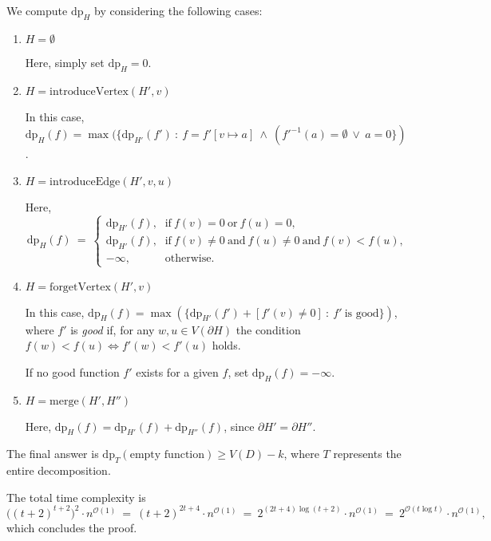 \documentclass[12pt]{article}
\begin{document}
	We compute \(\text{dp}_{H}\) by considering the following cases:
	\begin{enumerate}
		\item \(H = \emptyset\)
		      
		      Here, simply set \(\text{dp}_{H} = 0\).
		
		\item \(H = \text{introduceVertex}(H', v)\)
		      
		      In this case, \(\text{dp}_{H}(f) = \max(\{\text{dp}_{H'}(f') \ : \
		      f = f'[v \mapsto a] \ \wedge \ (f'^{-1}(a) = \emptyset \ \vee \ a
		      = 0\})\).
		
		\item \(H = \text{introduceEdge}(H', v, u)\)
		      
		      Here,
		      \[ \text{dp}_{H}(f) \ = \ \begin{cases} \text{dp}_{H'}(f) \text{,}
		      & \text{if} \ f(v) = 0 \ \text{or} \ f(u) = 0 \text{,} \\
		      \text{dp}_{H'}(f) \text{,} & \text{if} \ f(v) \neq 0 \ \text{and}
		      \ f(u) \neq 0 \ \text{and} \ f(v) < f(u) \text{,} \\
		      -\infty \text{,} & \text{otherwise.} \end{cases} \]
		
		\item \(H = \text{forgetVertex}(H', v)\)
		      
		      In this case, \(\text{dp}_{H}(f) = \max(\{\text{dp}_{H'}(f') +
		      [f'(v) \neq 0] \ : \ f' \ \text{is good}\})\), where \(f'\) is
		      \textit{good} if, for any \(w, u \in V(\partial H)\) the condition
		      \(f(w) < f(u) \iff f'(w) < f'(u)\) holds.
		      
		      If no good function \(f'\) exists for a given \(f\), set
		      \(\text{dp}_{H}(f) = -\infty\).
		
		\item \(H = \text{merge}(H', H'')\)
		      
		      Here, \(\text{dp}_{H}(f) = \text{dp}_{H'}(f) +
		      \text{dp}_{H''}(f)\), since \(\partial H' = \partial H''\).
	\end{enumerate}
	The final answer is \(\text{dp}_{T}(\text{empty function}) \geqslant V(D) -
	k\), where \(T\) represents the entire decomposition.
	
	\medskip
	
	The total time complexity is
	\[ \big( (t + 2)^{t + 2} \big)^{2} \cdot n^{\mathcal{O}(1)} \ = \
	(t + 2)^{2t + 4} \cdot n^{\mathcal{O}(1)} \ = \ 2^{(2t + 4) \log (t + 2)}
	\cdot n^{\mathcal{O}(1)} \ = \ 2^{\mathcal{O}(t \log t)} \cdot
	n^{\mathcal{O}(1)} \text{,} \]
	which concludes the proof.
\end{document}
